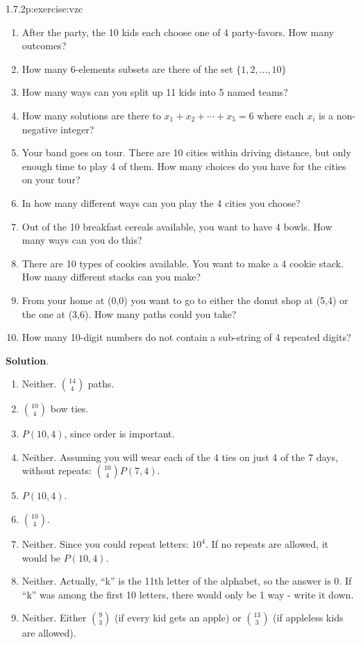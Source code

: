 \documentclass[twoside,11pt,]{book}
\newcommand{\blocktitlefont}{\relax}
\numberwithin{equation}{chapter}
\begin{document}
\begin{divisionsolution}{1.7.2}{}{p:exercise:vzc}
\begin{enumerate}[label=(\alph*)]
\item{}After the party, the 10 kids each choose one of 4 party-favors. How many outcomes?%
\item{}How many 6-elements subsets are there of the set \(\{1,2,\ldots, 10\}\)%
\item{}How many ways can you split up 11 kids into 5 named teams?%
\item{}How many solutions are there to \(x_1 + x_2 + \cdots + x_5 = 6\) where each \(x_i\) is a non-negative integer?%
\item{}Your band goes on tour. There are 10 cities within driving distance, but only enough time to play 4 of them. How many choices do you have for the cities on your tour?%
\item{}In how many different ways can you play the 4 cities you choose?%
\item{}Out of the 10 breakfast cereals available, you want to have 4 bowls. How many ways can you do this?%
\item{}There are 10 types of cookies available. You want to make a 4 cookie stack. How many different stacks can you make?%
\item{}From your home at (0,0) you want to go to either the donut shop at (5,4) or the one at (3,6). How many paths could you take?%
\item{}How many 10-digit numbers do not contain a sub-string of 4 repeated digits?%
\end{enumerate}
%
\par\smallskip%
\noindent\textbf{\blocktitlefont Solution}.\quad{}%
\begin{enumerate}[label=(\alph*)]
\item{}Neither. \({14 \choose 4}\) paths.%
\item{}\({10\choose 4}\) bow ties.%
\item{}\(P(10,4)\), since order is important.%
\item{}Neither. Assuming you will wear each of the 4 ties on just 4 of the 7 days, without repeats: \({10\choose 4}P(7,4)\).%
\item{}\(P(10,4)\).%
\item{}\({10\choose 4}\).%
\item{}Neither. Since you could repeat letters: \(10^4\). If no repeats are allowed, it would be \(P(10,4)\).%
\item{}Neither. Actually, ``k'' is the 11th letter of the alphabet, so the answer is 0. If ``k'' was among the first 10 letters, there would only be 1 way - write it down.%
\item{}Neither. Either \({9\choose 3}\) (if every kid gets an apple) or \({13 \choose 3}\) (if appleless kids are allowed).%

\end{enumerate}
\end{divisionsolution}
\end{document}
